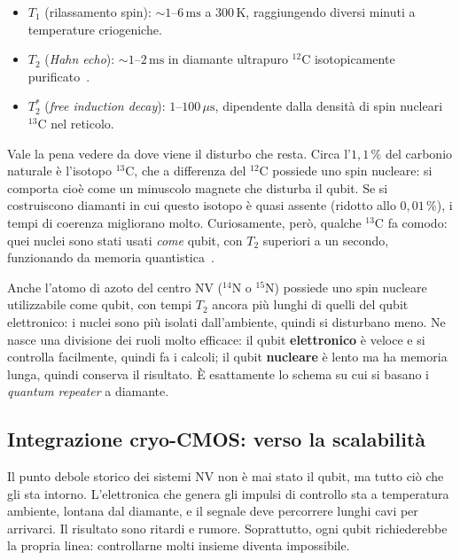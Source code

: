 \begin{itemize}
  \item $T_1$ (rilassamento spin): $\sim 1$--$6\,\text{ms}$ a $300\,\text{K}$,
    raggiungendo diversi minuti a temperature criogeniche.
  \item $T_2$ (\textit{Hahn echo}): $\sim 1$--$2\,\text{ms}$ in diamante
    ultrapuro $^{12}$C isotopicamente purificato~\cite{balasubramanian2009ultralong}.
  \item $T_2^*$ (\textit{free induction decay}): $1$--$100\,\mu\text{s}$,
    dipendente dalla densità di spin nucleari $^{13}$C nel reticolo.
\end{itemize}

Vale la pena vedere da dove viene il disturbo che resta. Circa l'$1{,}1\,\%$ del
carbonio naturale è l'isotopo $^{13}$C, che a differenza del $^{12}$C possiede
uno spin nucleare: si comporta cioè come un minuscolo magnete che disturba il
qubit. Se si costruiscono diamanti in cui questo isotopo è quasi assente
(ridotto allo $0{,}01\,\%$), i tempi di coerenza migliorano molto. Curiosamente,
però, qualche $^{13}$C fa comodo: quei nuclei sono stati usati \textit{come}
qubit, con $T_2$ superiori a un secondo, funzionando da memoria
quantistica~\cite{maurer2012room}.

\begin{notabox}
  Anche l'atomo di azoto del centro NV ($^{14}$N o $^{15}$N) possiede uno spin
  nucleare utilizzabile come qubit, con tempi $T_2$ ancora più lunghi di quelli
  del qubit elettronico: i nuclei sono più isolati dall'ambiente, quindi si
  disturbano meno. Ne nasce una divisione dei ruoli molto efficace: il qubit
  \textbf{elettronico} è veloce e si controlla facilmente, quindi fa i calcoli;
  il qubit \textbf{nucleare} è lento ma ha memoria lunga, quindi conserva il
  risultato. È esattamente lo schema su cui si basano i \textit{quantum
  repeater} a diamante.
\end{notabox}

\subsection{Integrazione cryo-CMOS: verso la scalabilità}
\label{subsec:nv-cmos}

Il punto debole storico dei sistemi NV non è mai stato il qubit, ma tutto ciò
che gli sta intorno. L'elettronica che genera gli impulsi di controllo sta a
temperatura ambiente, lontana dal diamante, e il segnale deve percorrere lunghi
cavi per arrivarci. Il risultato sono ritardi e rumore. Soprattutto, ogni qubit
richiederebbe la propria linea: controllarne molti insieme diventa
impossibile.

